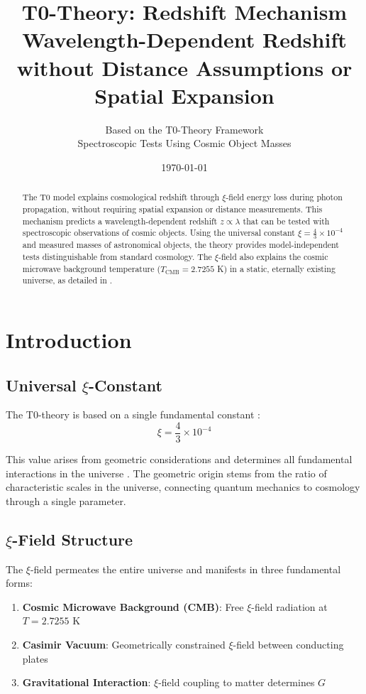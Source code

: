 \documentclass[12pt,a4paper]{article}
\title{\Huge\textbf{T0-Theory: Redshift Mechanism}\\
	\Large Wavelength-Dependent Redshift \\
	without Distance Assumptions or Spatial Expansion}
\author{Based on the T0-Theory Framework\\
	Spectroscopic Tests Using Cosmic Object Masses}
\date{\today}
\newcommand{\xiconst}{\xi = \frac{4}{3} \times 10^{-4}}
\theoremstyle{definition}
\begin{document}
	
	\maketitle
	
	\begin{abstract}
		The T0 model explains cosmological redshift through $\xi$-field energy loss during photon propagation, without requiring spatial expansion or distance measurements. This mechanism predicts a wavelength-dependent redshift $z \propto \lambda$ that can be tested with spectroscopic observations of cosmic objects. Using the universal constant $\xiconst$ and measured masses of astronomical objects, the theory provides model-independent tests distinguishable from standard cosmology. The $\xi$-field also explains the cosmic microwave background temperature ($T_{\text{CMB}} = 2.7255$ K) in a static, eternally existing universe, as detailed in \cite{pascher_cmb_en,pascher_cosmos_en}.
	\end{abstract}
	
	\tableofcontents
	\newpage
	
	\section{Introduction}
	
	\subsection{Universal $\xi$-Constant}
	
	The T0-theory is based on a single fundamental constant \cite{pascher_lagrangian_en}:
	\begin{equation}
		\boxed{\xiconst}
	\end{equation}
	
	This value arises from geometric considerations and determines all fundamental interactions in the universe \cite{pascher_gravitation_en}. The geometric origin stems from the ratio of characteristic scales in the universe, connecting quantum mechanics to cosmology through a single parameter.
	
	\subsection{$\xi$-Field Structure}
	
	The $\xi$-field permeates the entire universe and manifests in three fundamental forms:
	\begin{enumerate}
		\item \textbf{Cosmic Microwave Background (CMB)}: Free $\xi$-field radiation at $T = 2.7255$ K
		\item \textbf{Casimir Vacuum}: Geometrically constrained $\xi$-field between conducting plates
		\item \textbf{Gravitational Interaction}: $\xi$-field coupling to matter determines $G$
	\end{enumerate}
	
\end{document}
